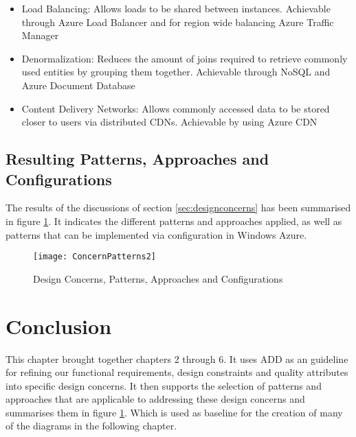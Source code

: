 \begin{itemize}
\item Load Balancing: Allows loads to be shared between instances. Achievable through Azure Load Balancer and for region wide balancing Azure Traffic Manager
\item Denormalization: Reduces the amount of joins required to retrieve commonly used entities by grouping them together. Achievable through NoSQL and Azure Document Database
\item Content Delivery Networks: Allows commonly accessed data to be stored closer to users via distributed CDNs. Achievable by using Azure CDN
\end{itemize}

\subsection{Resulting Patterns, Approaches and Configurations}
The results of the discussions of section \ref{sec:designconcerns} has been summarised in figure \ref{fig:concernpatterns}. It indicates the different patterns and approaches applied, as well as patterns that can be implemented via configuration in Windows Azure.


\begin{figure}
\centering
\texttt{[image: ConcernPatterns2]}
\caption{Design Concerns, Patterns, Approaches and Configurations}
\label{fig:concernpatterns}
\end{figure}

\section{Conclusion}
This chapter brought together chapters 2 through 6. It uses ADD as an guideline for refining our functional requirements, design constraints and quality attributes into specific design concerns. It then supports the selection of patterns and approaches that are applicable to addressing these design concerns and summarises them in figure \ref{fig:concernpatterns}. Which is used as baseline for the creation of many of the diagrams in the following chapter. 